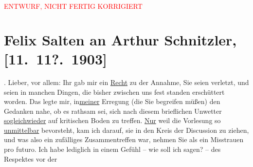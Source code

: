 
\begin{center}
            \textcolor{red}{ENTWURF, NICHT FERTIG KORRIGIERT}
                      \end{center}
            
         \renewcommand{\erwaehnteOrte}{Orte: Semmering, Wien}
         \renewcommand{\erwaehnteWerke}{}
               \section[Felix Salten an Arthur Schnitzler, {[}11. 11?. 1903{]}]{ Felix Salten an Arthur Schnitzler, {[}11. 11?. 1903{]}}\nopagebreak{}\rehead{ }\begin{ledgroupsized}[t]{13cm}\normalsize\beginnumbering \toendnotes[C]{\smallbreak\pagebreak[2]} 
\toendnotes[C]{\smallbreak}\pstart
           {\pb}\label{K_L03355-1v}\label{K_L03355-1h}.\pend
           \pstart
           Lieber, vor allem: Ihr \label{K_L03355-111v}\label{K_L03355-111h} gab mir ein \uline{Recht} zu der Annahme, Sie seien
               verletzt, und seien in manchen Dingen, die bisher zwischen uns fest standen
               erschüttert worden. Das legte mir, in\uline{meiner} Erregung
               (die Sie begreifen müßen) den Gedanken nahe, ob es rathsam sei, sich nach diesem
               brieflichen Unwetter \uline{sogleich}\uline{wieder} auf kritischen Boden zu treffen. \uline{Nur} weil die Vorlesung so \uline{unmittelbar} bevorsteht, kam ich darauf, sie in den Kreis der Discussion zu
               ziehen, und was also ein zufälliges Zusammentreffen war, nehmen Sie als ein
               Misstrauen pro futuro. \pend
           \pstart
           Ich habe lediglich in einem Gefühl – wie soll ich sagen? – des Respektes vor der

\end{ledgroupsized}
